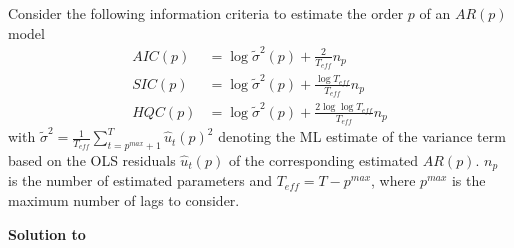 Consider the following information criteria to estimate the order $p$ of an $AR(p)$ model
\begin{align*}
    AIC(p) & = \log\tilde{\sigma}^2(p) + \frac{2}{T_{eff}}n_p                  \\
    SIC(p) & = \log\tilde{\sigma}^2(p) + \frac{\log T_{eff}}{T_{eff}}n_p       \\
    HQC(p) & = \log\tilde{\sigma}^2(p) + \frac{2\log \log T_{eff}}{T_{eff}}n_p
\end{align*}
with $\tilde{\sigma}^2=\frac{1}{T_{eff}}\sum_{t={p^{max}+1}}^{T} \hat{u}_t(p)^2$ denoting the ML estimate of the variance term based on the OLS residuals $\hat{u}_t(p)$ of the corresponding estimated $AR(p)$. $n_p$ is the number of estimated parameters and $T_{eff}=T-p^{max}$, where $p^{max}$ is the maximum number of lags to consider.
\begin{solution}\textbf{Solution to }\end{solution}
